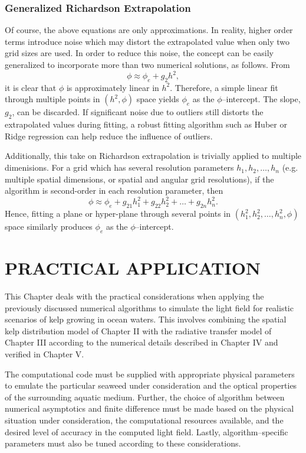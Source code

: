 \documentclass[ms,cpyr,lof,lot]{uathesis}
\begin{document}
\subsection{Generalized Richardson Extrapolation}
Of course, the above equations are only approximations.
In reality, higher order terms introduce noise which may distort the extrapolated value
when only two grid sizes are used.
In order to reduce this noise, the concept can be easily generalized to incorporate more than two numerical solutions, as follows.
From
\begin{equation*}
  \phi \approx \phi_e + g_2 h^2,
\end{equation*}
it is clear that $\phi$ is approximately linear in $h^2$.
Therefore, a simple linear fit through multiple points in $(h^2, \phi)$ space yields $\phi_e$ as the $\phi$--intercept.
The slope, $g_2$, can be discarded.
If significant noise due to outliers still distorts the extrapolated values during fitting, a robust fitting algorithm such as Huber \cite{yu_robust_2014} or Ridge \cite{hoerl_ridge_1970} regression can help reduce the influence of outliers.

Additionally, this take on Richardson extrapolation is trivially applied to multiple dimenisions.
For a grid which has several resolution parameters $h_1, h_2, \ldots, h_n$ (e.g. multiple spatial dimensions, or spatial and angular grid resolutions), if the algorithm is second-order in each resolution parameter, then
\begin{equation*}
  \phi \approx \phi_e + g_{21} h_1^2 + g_{22} h_2^2 + \ldots + g_{2n} h_n^2.
\end{equation*}
Hence, fitting a plane or hyper-plane through several points in $(h_1^2, h_2^2, \ldots, h_n^2, \phi)$ space similarly produces $\phi_e$ as the $\phi$--intercept.

\chapter{PRACTICAL APPLICATION}
\label{chap:application}

This Chapter deals with the practical considerations when applying the previously discussed numerical algorithms to simulate the light field for realistic scenarios of kelp growing in ocean waters.
This involves combining the spatial kelp distribution model of Chapter II with the radiative transfer model of Chapter III according to the numerical details described in Chapter IV and verified in Chapter V.

The computational code must be supplied with appropriate physical parameters to emulate the particular seaweed under consideration and the optical properties of the surrounding aquatic medium.
Further, the choice of algorithm between numerical asymptotics and finite difference must be made based on the physical situation under consideration, the computational resources available, and the desired level of accuracy in the computed light field.
Lastly, algorithm--specific parameters must also be tuned according to these considerations.
\end{document}
